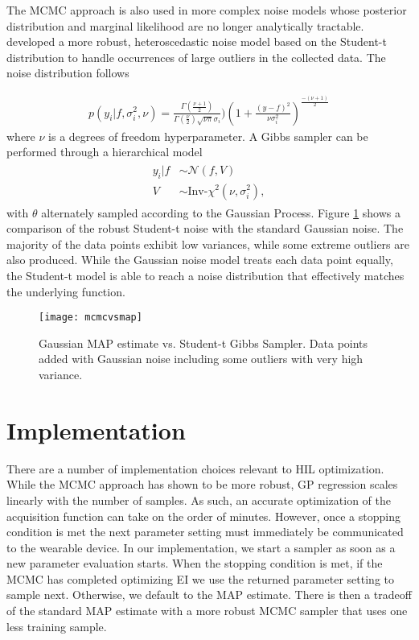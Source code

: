 The MCMC approach is also used in more complex noise models whose posterior distribution and marginal likelihood are no longer analytically tractable. \citet{NIPS2009_3806,Jylanki:2011:RGP:1953048.2078209} developed a more robust, heteroscedastic noise model based on the Student-t distribution to handle occurrences of large outliers in the collected data. The noise distribution follows

\begin{align}
p(y_i\vert f,\sigma_i^2,\nu) = \frac{\Gamma (\frac{\nu + 1}{2})}{\Gamma(\frac{\nu}{2})\sqrt{\nu\pi}\sigma_i})(1 + \frac{(y-f)^2}{\nu\sigma_i^2})^{\frac{-(\nu + 1)}{2}}
\end{align} 
where $\nu$ is a degrees of freedom hyperparameter. A Gibbs sampler can be performed through a hierarchical model
\begin{align}
\begin{split}
y_i\vert f &\sim \mathcal{N}(f, V)\\
V &\sim \text{Inv-}\chi^2(\nu, \sigma_i^2),
\end{split}
\end{align}
with $\theta$ alternately sampled according to the Gaussian Process. Figure \ref{fig:mcmcvsmap} shows a comparison of the robust Student-t noise with the standard Gaussian noise. The majority of the data points exhibit low variances, while some extreme outliers are also produced. While the Gaussian noise model treats each data point equally, the Student-t model is able to reach a noise distribution that effectively matches the underlying function.

\begin{figure}[t]
\centering
\texttt{[image: mcmcvsmap]}
\caption{Gaussian MAP estimate vs. Student-t Gibbs Sampler. Data points added with Gaussian noise including some outliers with very high variance.}
\label{fig:mcmcvsmap}
\end{figure}

\section{Implementation}
There are a number of implementation choices relevant to HIL optimization. While the MCMC approach has shown to be more robust, GP regression scales linearly with the number of samples. As such, an accurate optimization of the acquisition function can take on the order of minutes. However, once a stopping condition is met the next parameter setting must immediately be communicated to the wearable device. In our implementation, we start a sampler as soon as a new parameter evaluation starts. When the stopping condition is met, if the MCMC has completed optimizing EI we use the returned parameter setting to sample next. Otherwise, we default to the MAP estimate. There is then a tradeoff of the standard MAP estimate with a more robust MCMC sampler that uses one less training sample.


